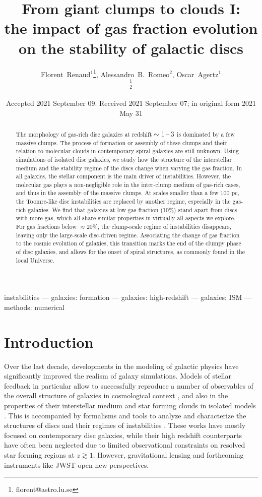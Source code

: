 \documentclass[useAMS,usenatbib]{mnras}
\title[Stability of galactic discs]{From giant clumps to clouds I:\\the impact of gas fraction evolution on the stability of galactic discs}
\author[Renaud, Romeo \& Agertz] {Florent~Renaud$^1$\thanks{florent@astro.lu.se}, Alessandro~B.~Romeo$^2$, Oscar~Agertz$^1$\\
$^1$ \lund\\
$^2$ \chalmers}
\date{Accepted 2021 September 09. Received 2021 September 07; in original form 2021 May 31}
\begin{document}
\maketitle


\begin{abstract}
The morphology of gas-rich disc galaxies at redshift $\sim 1\textrm{\,--\,} 3$ is dominated by a few massive clumps. The process of formation or assembly of these clumps and their relation to molecular clouds in contemporary spiral galaxies are still unknown. Using simulations of isolated disc galaxies, we study how the structure of the interstellar medium and the stability regime of the discs change when varying the gas fraction. In all galaxies, the stellar component is the main driver of instabilities. However, the molecular gas plays a non-negligible role in the inter-clump medium of gas-rich cases, and thus in the assembly of the massive clumps. At scales smaller than a few 100 pc, the Toomre-like disc instabilities are replaced by another regime, especially in the gas-rich galaxies. We find that galaxies at low gas fraction (10\%) stand apart from discs with more gas, which all share similar properties in virtually all aspects we explore. For gas fractions below $\approx 20\%$, the clump-scale regime of instabilities disappears, leaving only the large-scale disc-driven regime. Associating the change of gas fraction to the cosmic evolution of galaxies, this transition marks the end of the clumpy phase of disc galaxies, and allows for the onset of spiral structures, as commonly found in the local Universe.
\end{abstract}
\begin{keywords}instabilities --- galaxies: formation --- galaxies: high-redshift --- galaxies: ISM --- methods: numerical\end{keywords}


\section{Introduction}

Over the last decade, developments in the modeling of galactic physics have significantly improved the realism of galaxy simulations. Models of stellar feedback in particular allow to successfully reproduce a number of observables of the overall structure of galaxies in cosmological context \citep{Naab2017}, and also in the properties of their interstellar medium and star forming clouds in isolated models \citep{Grisdale2017, Grisdale2018, Grisdale2019}. This is accompanied by formalisms and tools to analyze and characterize the structures of discs and their regimes of instabilities \citep[e.g.][]{Romeo2010, Elmegreen2010, Agertz2015b}. These works have mostly focused on contemporary disc galaxies, while their high redshift counterparts have often been neglected due to limited observational constraints on resolved star forming regions at $z\gtrsim 1$. However, gravitational lensing \citep{Cava2018, Dessauges2019} and forthcoming instruments like JWST open new perspectives.
\end{document}
